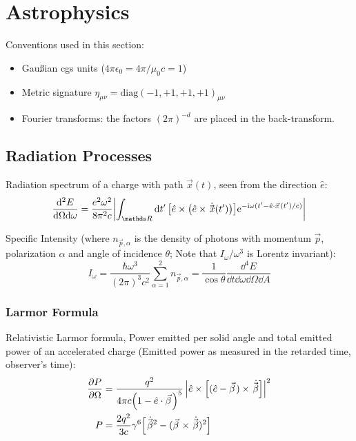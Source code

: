 \section{Astrophysics}
	Conventions used in this section:
	\begin{itemize}
		\item Gaußian cgs units ($4\pi\epsilon_0 = 4 \pi / \mu_0 c = 1$)
		\item Metric signature $\eta_{\mu\nu}=\mathrm{diag}(-1,+1,+1,+1)_{\mu\nu}$
		\item Fourier transforms: the factors $(2\pi)^{-d}$ are placed in the back-transform.
	\end{itemize}

	\subsection{Radiation Processes}
		Radiation spectrum of a charge with path $\vec{x}(t)$, seen from the direction $\hat{e}$:
		\begin{equation}
			\frac{\dd^2 E}{\dd \Omega \dd \omega} = \frac{e^2 \omega^2}{8 \pi^2 c} \abs{\int_{\reals }\dd{t'} \qty[\hat{e}\times \qty(\hat{e}\times \dot{\vec{x}}(t'))] \ex^{-\i \omega (t'-\hat{e}\cdot \vec{x}(t')/c)}}
		\end{equation}

		\noindent
		Specific Intensity (where $n_{\vec{p},\alpha}$ is the density of photons with momentum $\vec{p}$, polarization $\alpha$ and angle of incidence $\theta$; Note that $I_\omega / \omega^3$ is Lorentz invariant):
		\begin{equation}
			I_\omega = \frac{\hbar \omega^3}{(2 \pi)^3 c^2} \sum_{\alpha=1}^{2} n_{\vec{p},\alpha} = \frac{1}{\cos \theta} \frac{\dd^4 E}{\dd t \dd\omega \dd \Omega \dd A}
		\end{equation}

		\subsubsection{Larmor Formula}
			Relativistic Larmor formula,
			Power emitted per solid angle and total emitted power of an accelerated charge (Emitted power as measured in the retarded time, \ie observer's time):
			\begin{equation}
				\label{eq:LarmorFormula}
				\begin{aligned}
					\pdv{P}{\Omega} &= \frac{q^2}{4\pi c\qty(1-\hat{e}\cdot\vec{\beta})^5} \left| \hat{e}\times\qty[(\hat{e}-\vec{\beta}) \times \dot{\vec{\beta}}] \right|^2 \\
					P &= \frac{2q^2}{3c}\gamma^6\qty[\dot{\vec{\beta}}^2 - (\vec{\beta}\times\dot{\vec{\beta}})^2] \\
				\end{aligned}
			\end{equation}

